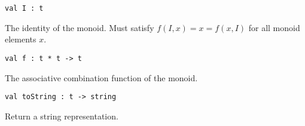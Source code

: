 \begin{cluster}
\label{grp:grm:aug-ordtable-interface::i}

\begin{gram}[I]
\label{grm:aug-ordtable-interface::i}
\begin{verbatim}
val I : t
\end{verbatim}
The identity of the monoid. Must satisfy $f(I, x) = x = f(x, I)$ for all
monoid elements $x$.

\end{gram}
\end{cluster}

\begin{cluster}
\label{grp:grm:aug-ordtable-interface::f}

\begin{gram}[f]
\label{grm:aug-ordtable-interface::f}
\begin{verbatim}
val f : t * t -> t
\end{verbatim}
The associative combination function of the monoid.

\end{gram}
\end{cluster}

\begin{cluster}
\label{grp:grm:aug-ordtable-interface::string}

\begin{gram}[toString]
\label{grm:aug-ordtable-interface::string}
\begin{verbatim}
val toString : t -> string
\end{verbatim}
Return a string representation.

\end{gram}
\end{cluster}

